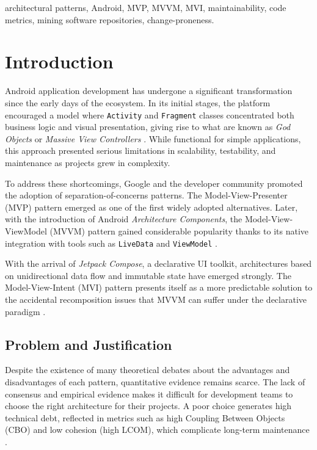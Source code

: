 \documentclass[conference]{IEEEtran}
\begin{document}
\begin{IEEEkeywords}
architectural patterns, Android, MVP, MVVM, MVI, maintainability, code metrics,
mining software repositories, change-proneness.
\end{IEEEkeywords}

\section{Introduction} \label{sec:Introduction}

Android application development has undergone a significant transformation
since the early days of the ecosystem. In its initial stages, the platform
encouraged a model where \texttt{Activity} and \texttt{Fragment} classes
concentrated both business logic and visual presentation, giving rise to
what are known as \textit{God Objects} or \textit{Massive View Controllers}
\cite{Vijaywargi:2024}. While functional for simple applications, this approach
presented serious limitations in scalability, testability, and maintenance
as projects grew in complexity.

To address these shortcomings, Google and the developer community promoted
the adoption of separation-of-concerns patterns. The Model-View-Presenter
(MVP) pattern emerged as one of the first widely adopted alternatives.
Later, with the introduction of Android \textit{Architecture Components},
the Model-View-ViewModel (MVVM) pattern gained considerable popularity
thanks to its native integration with tools such as \texttt{LiveData} and
\texttt{ViewModel} \cite{Pradana:2025}.

With the arrival of \textit{Jetpack Compose}, a declarative UI toolkit,
architectures based on unidirectional data flow and immutable state have
emerged strongly. The Model-View-Intent (MVI) pattern presents itself as
a more predictable solution to the accidental recomposition issues that
MVVM can suffer under the declarative paradigm \cite{Vijaywargi:2024}.

\subsection{Problem and Justification}

Despite the existence of many theoretical debates about the advantages and
disadvantages of each pattern, quantitative evidence remains scarce. The
lack of consensus and empirical evidence makes it difficult for development
teams to choose the right architecture for their projects. A poor choice
generates high technical debt, reflected in metrics such as high Coupling
Between Objects (CBO) and low cohesion (high LCOM), which complicate
long-term maintenance \cite{Filo:2024,ChidamberKemerer:1994}.
\end{document}
